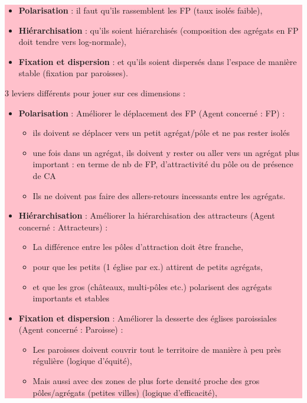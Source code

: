 \colorbox{pink}{\parbox{0.9\textwidth}{%
		\vskip5pt
		
		\begin{itemize}
			\item \textbf{Polarisation} : il faut qu'ils rassemblent les FP (taux isolés faible),
			\item \textbf{Hiérarchisation} : qu'ils soient hiérarchisés (composition des agrégats en FP doit tendre vers log-normale),
			\item \textbf{Fixation et dispersion} : et qu'ils soient dispersés dans l'espace de manière stable (fixation par paroisses).
		\end{itemize}
		
		3 leviers différents pour jouer sur ces dimensions :
		\begin{itemize}
			\item \textbf{Polarisation} : Améliorer le déplacement des FP (Agent concerné : FP) :
			\begin{itemize}
				\item ils doivent se déplacer vers un petit agrégat/pôle et ne pas rester isolés
				\item une fois dans un agrégat, ils doivent y rester ou aller vers un agrégat plus \og important\fg{} : en terme de nb de FP, d'attractivité du pôle ou de présence de CA
				\item Ils ne doivent pas faire des allers-retours incessants entre les agrégats.
			\end{itemize}
			
			\item \textbf{Hiérarchisation} : Améliorer la hiérarchisation des attracteurs (Agent concerné : Attracteurs) :
			\begin{itemize}
				\item La différence entre les pôles d'attraction doit être franche,
				\item pour que les petits (1 église par ex.) attirent de petits agrégats,
				\item et que les gros (châteaux, multi-pôles etc.) polarisent des agrégats importants et stables
			\end{itemize}
			\item \textbf{Fixation et dispersion} : Améliorer la desserte des églises paroissiales (Agent concerné : Paroisse) :
			\begin{itemize}
				\item Les paroisses doivent couvrir tout le territoire de manière à peu près régulière (logique d'équité),
				\item Mais aussi avec des zones de plus forte densité proche des gros pôles/agrégats (petites villes) (logique d'efficacité),
			\end{itemize}
			
		\end{itemize}
		
		\vskip5pt
	}
}	
